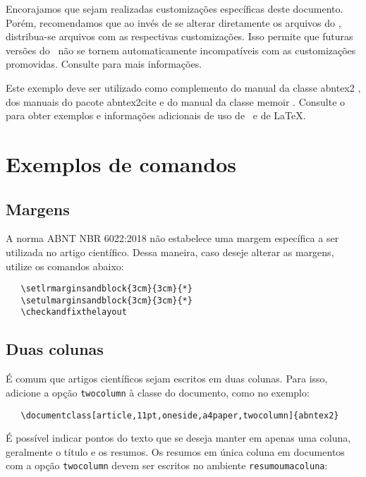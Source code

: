 \documentclass[
	article,			%
	12pt,				%
	oneside,			%
	a4paper,			%
	english,			%
	brazil,				%
	sumario=tradicional
	]{abntex2}
\begin{document}
Encorajamos que sejam realizadas customizações específicas deste documento.
Porém, recomendamos que ao invés de se alterar diretamente os arquivos do
\abnTeX, distribua-se arquivos com as respectivas customizações. Isso permite
que futuras versões do \abnTeX~não se tornem automaticamente incompatíveis com
as customizações promovidas. Consulte 
para mais informações.

Este exemplo deve ser utilizado como complemento do manual da classe
\textsf{abntex2} \cite{abntex2classe}, dos manuais do pacote
\textsf{abntex2cite} \cite{abntex2cite,abntex2cite-alf} e do manual da classe
\textsf{memoir} \cite{memoir}. Consulte o  para obter
exemplos e informações adicionais de uso de \abnTeX\ e de \LaTeX.

\section{Exemplos de comandos}

\subsection{Margens}

A norma ABNT NBR 6022:2018 não estabelece uma margem específica a ser utilizada
no artigo científico. Dessa maneira, caso deseje alterar as margens, utilize os
comandos abaixo:

\begin{verbatim}
   \setlrmarginsandblock{3cm}{3cm}{*}
   \setulmarginsandblock{3cm}{3cm}{*}
   \checkandfixthelayout
\end{verbatim}

\subsection{Duas colunas}

É comum que artigos científicos sejam escritos em duas colunas. Para isso,
adicione a opção \texttt{twocolumn} à classe do documento, como no exemplo:

\begin{verbatim}
   \documentclass[article,11pt,oneside,a4paper,twocolumn]{abntex2}
\end{verbatim}

É possível indicar pontos do texto que se deseja manter em apenas uma coluna,
geralmente o título e os resumos. Os resumos em única coluna em documentos com
a opção \texttt{twocolumn} devem ser escritos no ambiente
\texttt{resumoumacoluna}:
\end{document}
